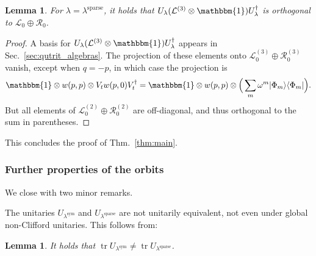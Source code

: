 \documentclass[aps,nofootinbib,floatfix,a4paper]{revtex4}
\newtheorem{lemma}[theorem]{Lemma}
\newcommand{\sym}{^\mathrm{sym}}
\newcommand{\sparse}{^\mathrm{sparse}}
\newcommand{\1}{\mbox{$\mathbf{1}$}}
\def\R{\mathcal{R}}
\def\Id{\mathbbm{1}}
\DeclareMathOperator{\tr}{tr}
\begin{document}
\begin{lemma}\label{lem:sparse_works}
	For $\lambda=\lambda\sparse$, it holds that
		$U_\lambda(\mathcal{L}^{(3)}\otimes \Id) U^\dagger_\lambda$
		is orthogonal to
		$\mathcal{L}_0 \oplus \mathcal{R}_0$.
\end{lemma}

\begin{proof}
	A basis for $U_\lambda(\mathcal{L}^{(3)}\otimes \Id) U^\dagger_\lambda$ appears in Sec.~\ref{sec:qutrit_algebras}.
	The projection of these elements onto $\mathcal{L}^{(3)}_0\oplus\R^{(3)}_0$ vanish, except when $q=-p$, in which case the projection is 
	\begin{align*}
		\Id\otimes w(p,p) \otimes V_t w(p,0) V_t^\dagger
		=
		\Id\otimes w(p,p) \otimes \Big(\sum_{m} \omega^m |\Phi_m\rangle\langle\Phi_m|\Big).
	\end{align*}
	But all elements of $\mathcal{L}^{(2)}_0\oplus\mathcal{R}^{(2)}_0$ are off-diagonal, and thus orthogonal to the sum in parentheses.
\end{proof}

This concludes the proof of Thm.~\ref{thm:main}.


\subsubsection{Further properties of the orbits}

We close with two minor remarks.

The unitaries $U_{\lambda\sym}$ and $U_{\lambda\sparse}$  
are not unitarily equivalent, not even under global non-Clifford unitaries. 
This follows from:

\begin{lemma}
	It holds that $\tr U_{\lambda\sym} \neq \tr U_{\lambda\sparse}$.
\end{lemma}
\end{document}
